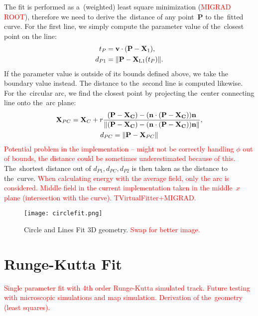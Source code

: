 			The fit is performed as a~(weighted) least square minimization (\textcolor{red}{MIGRAD ROOT}), therefore we need to derive the~distance of any point~$\mathbf{P}$ to the~fitted curve. For the first line, we simply compute the parameter value of the~closest point on the line:
				\begin{align}
					t_P &= \mathbf{v}\cdot(\mathbf{P}-\mathbf{X}_1),\\
					d_{P1} &= \norm{\mathbf{P}-\mathbf{X}_\text{L1}(t_P)}.
				\end{align}
			If the parameter value is outside of its bounds defined above, we take the boundary value instead. The distance to the~second line is computed likewise. For the~circular arc, we find the closest point by projecting the~center connecting line onto the~arc plane:
				\begin{gather}
					\mathbf{X}_{PC} = \mathbf{X}_C + r\frac{(\mathbf{P-\mathbf{X}_C})-(\mathbf{n}\cdot(\mathbf{P-\mathbf{X}_C}))\mathbf{n}}{\norm{(\mathbf{P-\mathbf{X}_C})-(\mathbf{n}\cdot(\mathbf{P-\mathbf{X}_C}))\mathbf{n}}},\\
					d_{PC} = \norm{\mathbf{P}-\mathbf{X}_{PC}}
				\end{gather}
			\textcolor{red}{Potential problem in the implementation -- might not be correctly handling $\phi$ out of bounds, the distance could be sometimes underestimated because of this.} The~shortest distance out of $d_{P1},d_{PC},d_{P2}$ is then taken as the distance to the~curve. \textcolor{red}{When calculating energy with the average field, only the arc is considered. Middle field in the current implementation taken in the middle~$x$ plane (intersection with the curve). TVirtualFitter+MIGRAD.}
			
			\begin{figure}
				\centering
				\texttt{[image: circlefit.png]}
				\caption{Circle and Lines Fit 3D geometry. \textcolor{red}{Swap for better image.}}
				\label{fig:circlefit}
			\end{figure}
	
	\section{Runge-Kutta Fit}
		\textcolor{red}{Single parameter fit with 4th order Runge-Kutta simulated track. Future testing with microscopic simulations and map simulation. Derivation of the~geometry (least squares).}
